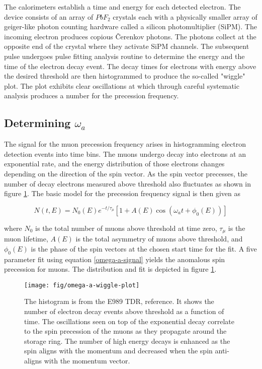 The calorimeters establish a time and energy for each detected electron.  The device consists of an array of $PbF_2$ crystals each with a physically smaller array of geiger-like photon counting hardware called a silicon photomultiplier (SiPM).  The incoming electron produces copious \v{C}erenkov photons.  The photons collect at the opposite end of the crystal where they activate SiPM channels.  The subsequent pulse undergoes pulse fitting analysis routine to determine the energy and the time of the electron decay event.  The decay times for electrons with energy above the desired threshold are then histogrammed to produce the so-called "wiggle" plot.  The plot exhibits clear oscillations at \wa which through careful systematic analysis produces a number for the precession frequency.

\subsection{Determining $\omega_a$}

The signal for the muon precession frequency arises in histogramming electron detection events into time bins.  The muons undergo decay into electrons at an exponential rate, and the energy distribution of those electrons changes depending on the direction of the spin vector.  As the spin vector precesses, the number of decay electrons measured above threshold also fluctuates as shown in figure \ref{fig:omega-a-wiggle-plot}.  The basic model for the precession frequency signal is then given as 

\begin{equation}
\label{eqn:omega-a-signal}
N(t, E) = N_0(E) e^{-t/\tau_\mu} \left[ 1 + A(E) \cos(\omega_a t + \phi_0(E))\right]
\end{equation}

where $N_0$ is the total number of muons above threshold at time zero, $\tau_\mu$ is the muon lifetime, $A(E)$ is the total asymmetry of muons above threshold, and $\phi_0(E)$ is the phase of the spin vectors at the chosen start time for the fit.  A five parameter fit using equation \ref{omega-a-signal} yields the anomalous spin precession for muons.  The distribution and fit is depicted in figure \ref{fig:omega-a-wiggle-plot}.

\begin{figure}
\label{fig:omega-a-wiggle-plot}
\texttt{[image: fig/omega-a-wiggle-plot]}
\caption{The histogram is from the E989 TDR, reference\cite{e989-tdr}.  It shows the number of electron decay events above threshold as a function of time.  The oscillations seen on top of the exponential decay correlate to the spin precession of the muons as they propagate around the storage ring.  The number of high energy decays is enhanced as the spin aligns with the momentum and decreased when the spin anti-aligns with the momentum vector.}
\end{figure}

